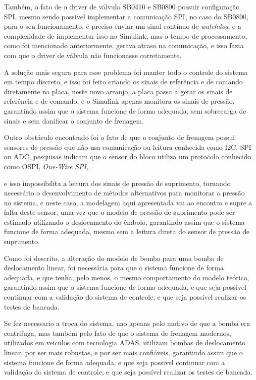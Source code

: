 Também, o fato de o driver de válvula SB0410 e SB0800 possuir configuração SPI, mesmo sendo possível implementar a comunicação SPI, no caso do SB0800, para o seu funcionamento, é preciso enviar um sinal contínuo de \textit{watchdog}, e a complexidade de implementar isso no Simulink, mas o tempo de processamento, como foi mencionado anteriormente, gerava atraso na comunicação, e isso fazia com que o driver de válvula não funcionasse corretamente.

A solução mais segura para esse problema foi manter todo o controle do sistema em tempo discreto, e isso foi feito criando os sinais de referência e de comando diretamente na placa, neste novo arranjo, a placa passa a gerar os sinais de referência e de comando, e o Simulink apenas monitora os sinais de pressão, garantindo assim que o sistema funcione de forma adequada, sem sobrecarga de sinais e sem danificar o conjunto de frenagem.

Outro obstáculo encontrado foi o fato de que o conjunto de frenagem possui sensores de pressão que não usa comunicação ou leitura conhecida como I2C, SPI ou ADC, pesquisas indicam que o sensor do bloco utiliza um protocolo conhecido como OSPI, \textit{One-Wire SPI},  e isso impossibilita a leitura dos sinais de pressão de suprimento, tornando necessário o desenvolvimento de métodos alternativos para monitorar a pressão no sistema, e neste caso, a modelagem aqui apresentada vai ao encontro e supre a falta deste sensor, uma vez que o modelo de pressão de suprimento pode ser estimado utilizando o deslocamento do êmbolo, garantindo assim que o sistema funcione de forma adequada, mesmo sem a leitura direta do sensor de pressão de suprimento.

Como foi descrito, a alteração do modelo de bomba para uma bomba de deslocamento linear, foi necessária para que o sistema funcione de forma adequada, e que tenha, pelo menos, o mesmo comportamento do modelo teórico, garantindo assim que o sistema funcione de forma adequada, e que seja possivel continuar com a validação do sistema de controle, e que seja possível realizar os testes de bancada. 

Se fez necessario a troca do sistema, nao apenas pelo motivo de que a bomba era centrifuga, mas também pelo fato de que o sistema de frenagem modernos, utilizados em veiculos com tecnologia ADAS, utilizam bombas de deslocamento linear, por ser mais robustas, e por ser mais confiáveis, garantindo assim que o sistema funcione de forma adequada, e que seja possivel continuar com a validação do sistema de controle, e que seja possível realizar os testes de bancada.


